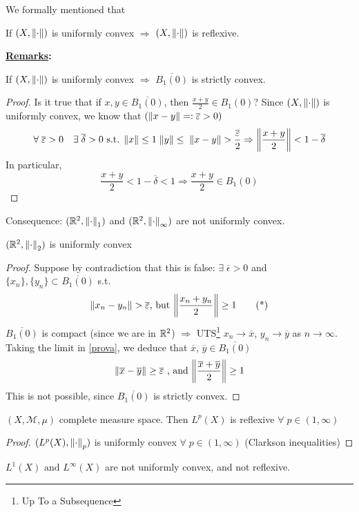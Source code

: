 We formally mentioned that
\begin{theorem}
    If \((X, \norm{\cdot})\) is uniformly convex \(\Rightarrow\) \((X, \norm{\cdot})\) is reflexive.
\end{theorem}

\noindent\textbf{\underline{Remarks}:}
    \begin{proposition}
        If \((X, \norm{\cdot})\) is uniformly convex \(\Rightarrow\) \(\overline{B_1(0)}\) is strictly convex.
    \end{proposition}
    \begin{proof}
        Is it true that if \(x, y \in \overline{B_1(0)}\), then \(\frac{x+y}{2} \in B_1(0)\)? Since \((X, \norm{\cdot})\) is uniformly convex, we know that \((\norm{x-y}=: \overline{\varepsilon}>0)\)
        \[
            \forall \; \overline{\varepsilon}>0 \quad \exists \; \overline{\delta} >0 \text{ s.t. } \norm{x} \leq 1 \; \norm{y} \leq \; \norm{x-y} > \frac{\overline{\varepsilon}}{2} \Rightarrow \norm{\frac{x+y}{2}} < 1-\overline{\delta} 
        \]
        In particular, 
        \[
            \frac{x+y}{2} < 1-\overline{\delta} < 1 \Rightarrow \frac{x+y}{2} \in B_1(0)
        \] 
    \end{proof}
    Consequence: \((\mathbb{R}^2, \norm{\cdot}_1)\) and \((\mathbb{R}^2, \norm{\cdot}_\infty)\) are not uniformly convex.
\begin{proposition}
    \((\mathbb{R}^2, \norm{\cdot}_2)\) is uniformly convex
\end{proposition}
\begin{proof}
    Suppose by contradiction that this is false:
    \( \exists \; \overline{\epsilon} >0 \) and \( \{x_n\}, \{y_n\} \subset \overline{B_1(0)} \) s.t. 
    \begin{equation}\label{prova}
            \norm{x_n - y_n} > \overline{\varepsilon} \text{, but } \norm{\frac{x_n + y_n}{2}} \geq 1 \tag{*}
    \end{equation}
    \(\overline{B_1(0)}\) is compact (since we are in \(\mathbb{R}^2\)) \(\Rightarrow\) UTS\footnote{Up To a Subsequence} \(x_n \to \overline{x} \), \(y_n \to \overline{y}\) as \(n \to\infty\). Taking the limit in \eqref{prova}, we deduce that \(\overline{x}\), \(\overline{y} \in \overline{B_1(0)}\)
    \[
        \norm{\overline{x}- \overline{y}} \geq \overline{\varepsilon} \text{ , and } \norm{\frac{\overline{x}+\overline{y}}{2}} \geq 1
    \]
    This is not possible, since \(\overline{B_1(0)}\) is strictly convex.
\end{proof}

\begin{theorem}
    \((X, \mathcal{M}, \mu)\) complete measure space. Then \(L^{p}(X)\) is reflexive \(\forall \; p \in (1, \infty)\)
\end{theorem}
\begin{proof}
    \((L^p(X), \norm{\cdot}_p)\) is uniformly convex \(\forall \; p \in (1, \infty)\) (Clarkson inequalities)
\end{proof}
\(L^1(X) \text{ and } L^\infty(X)\) are not uniformly convex, and not reflexive.

